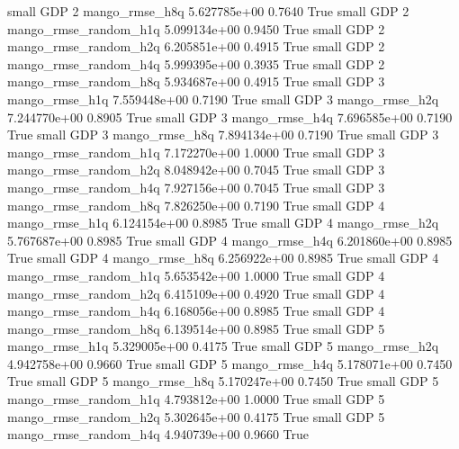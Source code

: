      small      GDP                 2        mango_rmse_h8q 5.627785e+00      0.7640    True
     small      GDP                 2 mango_rmse_random_h1q 5.099134e+00      0.9450    True
     small      GDP                 2 mango_rmse_random_h2q 6.205851e+00      0.4915    True
     small      GDP                 2 mango_rmse_random_h4q 5.999395e+00      0.3935    True
     small      GDP                 2 mango_rmse_random_h8q 5.934687e+00      0.4915    True
     small      GDP                 3        mango_rmse_h1q 7.559448e+00      0.7190    True
     small      GDP                 3        mango_rmse_h2q 7.244770e+00      0.8905    True
     small      GDP                 3        mango_rmse_h4q 7.696585e+00      0.7190    True
     small      GDP                 3        mango_rmse_h8q 7.894134e+00      0.7190    True
     small      GDP                 3 mango_rmse_random_h1q 7.172270e+00      1.0000    True
     small      GDP                 3 mango_rmse_random_h2q 8.048942e+00      0.7045    True
     small      GDP                 3 mango_rmse_random_h4q 7.927156e+00      0.7045    True
     small      GDP                 3 mango_rmse_random_h8q 7.826250e+00      0.7190    True
     small      GDP                 4        mango_rmse_h1q 6.124154e+00      0.8985    True
     small      GDP                 4        mango_rmse_h2q 5.767687e+00      0.8985    True
     small      GDP                 4        mango_rmse_h4q 6.201860e+00      0.8985    True
     small      GDP                 4        mango_rmse_h8q 6.256922e+00      0.8985    True
     small      GDP                 4 mango_rmse_random_h1q 5.653542e+00      1.0000    True
     small      GDP                 4 mango_rmse_random_h2q 6.415109e+00      0.4920    True
     small      GDP                 4 mango_rmse_random_h4q 6.168056e+00      0.8985    True
     small      GDP                 4 mango_rmse_random_h8q 6.139514e+00      0.8985    True
     small      GDP                 5        mango_rmse_h1q 5.329005e+00      0.4175    True
     small      GDP                 5        mango_rmse_h2q 4.942758e+00      0.9660    True
     small      GDP                 5        mango_rmse_h4q 5.178071e+00      0.7450    True
     small      GDP                 5        mango_rmse_h8q 5.170247e+00      0.7450    True
     small      GDP                 5 mango_rmse_random_h1q 4.793812e+00      1.0000    True
     small      GDP                 5 mango_rmse_random_h2q 5.302645e+00      0.4175    True
     small      GDP                 5 mango_rmse_random_h4q 4.940739e+00      0.9660    True
